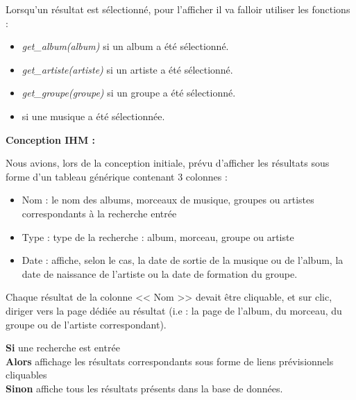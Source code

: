             \begin{paragraphe}
                 Lorsqu'un résultat est sélectionné, pour l'afficher il va falloir utiliser les fonctions :
                \begin{itemize}
                    \item \emph{get\_album(album)} si un album a été sélectionné.
                    \item \emph{get\_artiste(artiste)} si un artiste a été sélectionné.
                    \item \emph{get\_groupe(groupe)} si un groupe a été sélectionné.
                    \item {} si une musique a été sélectionnée.
                \end{itemize}
            \end{paragraphe}

			\begin{paragraphe}
				\textbf{Conception IHM :}
			\end{paragraphe}

			\begin{paragraphe}
			    Nous avions, lors de la conception initiale, prévu d'afficher les résultats sous forme d'un tableau générique contenant 3 colonnes :
				\begin{itemize}
					\item Nom : le nom des albums, morceaux de musique, groupes ou artistes correspondants à la recherche entrée
					\item Type : type de la recherche : album, morceau, groupe ou artiste
					\item Date : affiche, selon le cas, la date de sortie de la musique ou de l'album, la date de naissance de l'artiste ou la date de formation du groupe.
				\end{itemize}
				Chaque résultat de la colonne << Nom >> devait être cliquable, et sur clic, diriger vers la page dédiée au résultat (i.e : la page de l'album, du morceau, du groupe ou de l'artiste correspondant).
			\end{paragraphe}
            

            \begin{paragraphe}
                \textbf{Si} une recherche est entrée\\
                \textbf{Alors} affichage les résultats correspondants sous forme de liens prévisionnels cliquables\\
                \textbf{Sinon} affiche tous les résultats présents dans la base de données.
            \end{paragraphe}

